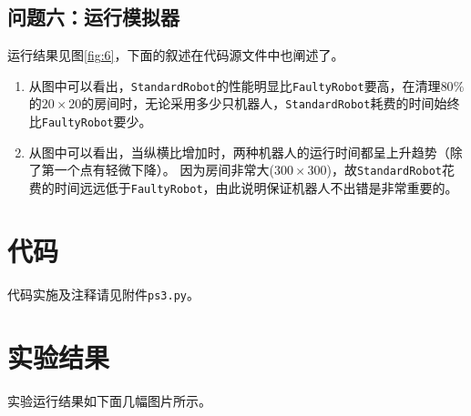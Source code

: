 \documentclass[logo,reportComp]{thesis}
\begin{document}
\subsection{问题六：运行模拟器}
运行结果见图\ref{fig:6}，下面的叙述在代码源文件中也阐述了。
\begin{enumerate}
    \item 从图中可以看出，\verb'StandardRobot'的性能明显比\verb'FaultyRobot'要高，在清理$80\%$的$20\times 20$的房间时，无论采用多少只机器人，\verb'StandardRobot'耗费的时间始终比\verb'FaultyRobot'要少。
    \item 从图中可以看出，当纵横比增加时，两种机器人的运行时间都呈上升趋势（除了第一个点有轻微下降）。
    因为房间非常大($300\times 300$)，故\verb'StandardRobot'花费的时间远远低于\verb'FaultyRobot'，由此说明保证机器人不出错是非常重要的。
\end{enumerate}

\section{代码}
代码实施及注释请见附件\verb'ps3.py'。

\section{实验结果}
\label{sec:exp}
实验运行结果如下面几幅图片所示。
\end{document}
